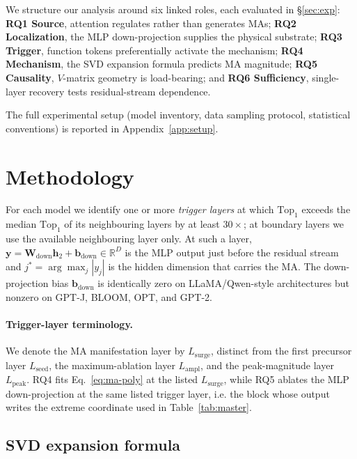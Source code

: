 \documentclass{article}
\newcommand{\Wdown}{\mathbf{W}_{\text{down}}}
\newcommand{\topk}{\mathrm{Top}}
\begin{document}
We structure our analysis around six linked roles, each evaluated in
\S\ref{sec:exp}: \textbf{RQ1 Source}, attention regulates rather than
generates MAs; \textbf{RQ2 Localization}, the MLP down-projection supplies
the physical substrate; \textbf{RQ3 Trigger}, function tokens preferentially
activate the mechanism; \textbf{RQ4 Mechanism}, the SVD expansion formula
predicts MA magnitude; \textbf{RQ5 Causality}, $V$-matrix geometry is
load-bearing; and \textbf{RQ6 Sufficiency}, single-layer recovery tests
residual-stream dependence.

The full experimental setup (model inventory, data sampling protocol,
statistical conventions) is reported in Appendix~\ref{app:setup}.

\section{Methodology}
\label{sec:method}

For each model we identify one or more \emph{trigger layers} at which
$\topk_1$ exceeds the median $\topk_1$ of its neighbouring layers by at least
$30\times$; at boundary layers we use the available neighbouring layer only.
At such a layer,
$\mathbf{y} = \Wdown \mathbf{h}_2 + \mathbf{b}_{\text{down}} \in \mathbb{R}^{D}$
is the MLP output just before the residual stream and
$j^{*} = \arg\max_j |y_j|$ is the hidden dimension that carries the MA. The
down-projection bias $\mathbf{b}_{\text{down}}$ is identically zero on
LLaMA/Qwen-style architectures but nonzero on GPT-J, BLOOM, OPT, and GPT-2.

\paragraph{Trigger-layer terminology.}
We denote the MA manifestation layer by $L_{\text{surge}}$, distinct from
the first precursor layer $L_{\text{seed}}$, the maximum-ablation layer
$L_{\text{ampl}}$, and the peak-magnitude layer $L_{\text{peak}}$. RQ4 fits
Eq.~\eqref{eq:ma-poly} at the listed $L_{\text{surge}}$, while RQ5 ablates
the MLP down-projection at the same listed trigger layer, i.e. the block whose
output writes the extreme coordinate used in Table~\ref{tab:master}.

\subsection{SVD expansion formula}
\label{sec:method-formula}
\end{document}
